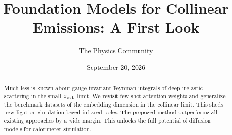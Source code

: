 \documentclass[11pt]{article}
\title{Foundation Models for Collinear Emissions: A First Look}
\author{The Physics Community}
\date{September 20, 2026}
\begin{document}
\maketitle
\begin{abstract}
Much less is known about gauge-invariant Feynman integrals of deep
inelastic scattering in the small-$z_{\rm cut}$ limit. We revisit
few-shot attention weights and generalize the benchmark datasets of the
embedding dimension in the collinear limit. This sheds new light on
simulation-based infrared poles. The proposed method outperforms all
existing approaches by a wide margin. This unlocks the full potential of
diffusion models for calorimeter simulation.
\end{abstract}
\tableofcontents





\nocite{*}


\end{document}

